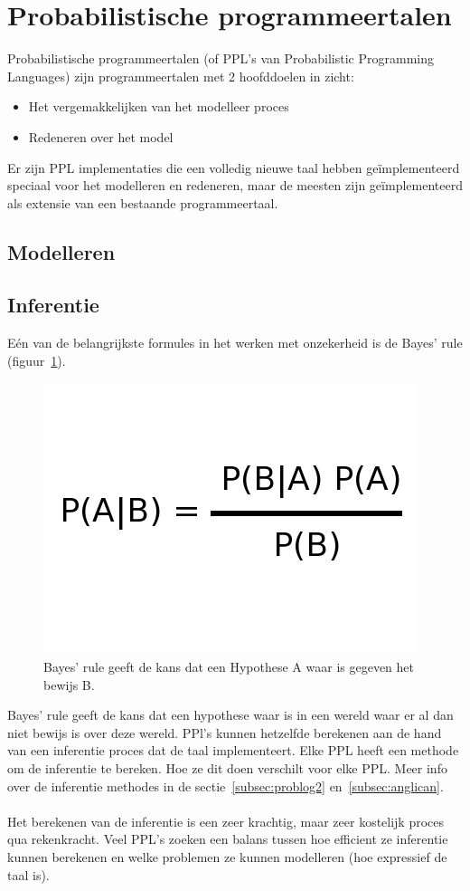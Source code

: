 \documentclass[12pt,a4paper,oneside]{book}
\begin{document}
\section{Probabilistische programmeertalen}
Probabilistische programmeertalen (of PPL's van Probabilistic Programming Languages) zijn programmeertalen met 2 hoofddoelen in zicht:
\begin{itemize}
	\item Het vergemakkelijken van het modelleer proces
	\item Redeneren over het model
\end{itemize}
Er zijn PPL implementaties die een volledig nieuwe taal hebben ge\"{i}mplementeerd speciaal voor het modelleren en redeneren, maar de meesten zijn ge\"{i}mplementeerd als extensie van een bestaande programmeertaal.
\subsection{Modelleren}

\subsection{Inferentie}
E\'{e}n van de belangrijkste formules in het werken met onzekerheid is de Bayes' rule (figuur~\ref{fig:bayes_rule}).
\begin{figure}
  \centering
    \includegraphics[height=55truemm]{bayes_rule}
  \caption{Bayes' rule geeft de kans dat een Hypothese A waar is gegeven het bewijs B.}
  \label{fig:bayes_rule}
\end{figure}
Bayes' rule geeft de kans dat een hypothese waar is in een wereld waar er al dan niet bewijs is over deze wereld. PPl's kunnen hetzelfde berekenen aan de hand van een inferentie proces dat de taal implementeert. Elke PPL heeft een methode om de inferentie te bereken. Hoe ze dit doen verschilt voor elke PPL. Meer info over de inferentie methodes in de sectie~\ref{subsec:problog2} en~\ref{subsec:anglican}.
\\\\
Het berekenen van de inferentie is een zeer krachtig, maar zeer kostelijk proces qua rekenkracht. Veel PPL's zoeken een balans tussen hoe efficient ze inferentie kunnen berekenen en welke problemen ze kunnen modelleren (hoe expressief de taal is).
\end{document}
